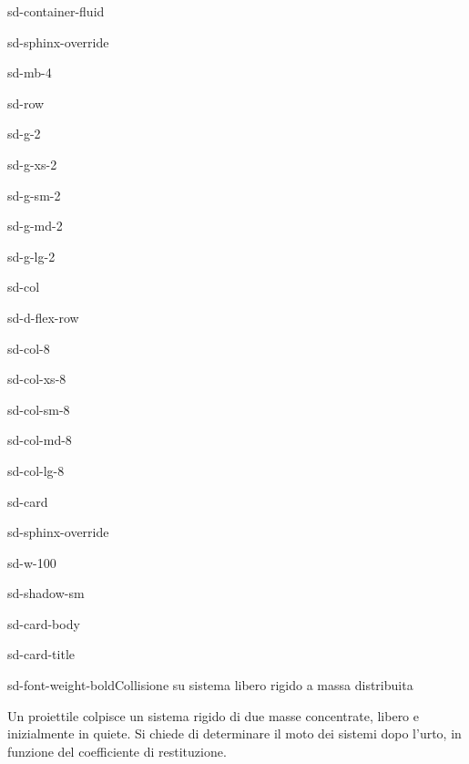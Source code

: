 \documentclass[letterpaper,10pt,italian]{jupyterBook}
\begin{document}
\begin{sphinxuseclass}{sd-container-fluid}
\begin{sphinxuseclass}{sd-sphinx-override}
\begin{sphinxuseclass}{sd-mb-4}
\begin{sphinxuseclass}{sd-row}
\begin{sphinxuseclass}{sd-g-2}
\begin{sphinxuseclass}{sd-g-xs-2}
\begin{sphinxuseclass}{sd-g-sm-2}
\begin{sphinxuseclass}{sd-g-md-2}
\begin{sphinxuseclass}{sd-g-lg-2}
\begin{sphinxuseclass}{sd-col}
\begin{sphinxuseclass}{sd-d-flex-row}
\begin{sphinxuseclass}{sd-col-8}
\begin{sphinxuseclass}{sd-col-xs-8}
\begin{sphinxuseclass}{sd-col-sm-8}
\begin{sphinxuseclass}{sd-col-md-8}
\begin{sphinxuseclass}{sd-col-lg-8}
\begin{sphinxuseclass}{sd-card}
\begin{sphinxuseclass}{sd-sphinx-override}
\begin{sphinxuseclass}{sd-w-100}
\begin{sphinxuseclass}{sd-shadow-sm}
\begin{sphinxuseclass}{sd-card-body}
\begin{sphinxuseclass}{sd-card-title}
\begin{sphinxuseclass}{sd-font-weight-bold}Collisione su sistema libero rigido a massa distribuita
\end{sphinxuseclass}
\end{sphinxuseclass}
\sphinxAtStartPar
Un proiettile colpisce un sistema rigido di due masse concentrate, libero e inizialmente in quiete. Si chiede di determinare il moto dei sistemi dopo l’urto, in funzione del coefficiente di restituzione.


\end{sphinxuseclass}
\end{sphinxuseclass}
\end{sphinxuseclass}
\end{sphinxuseclass}
\end{sphinxuseclass}
\end{sphinxuseclass}
\end{sphinxuseclass}
\end{sphinxuseclass}
\end{sphinxuseclass}
\end{sphinxuseclass}
\end{sphinxuseclass}
\end{sphinxuseclass}
\end{sphinxuseclass}
\end{sphinxuseclass}
\end{sphinxuseclass}
\end{sphinxuseclass}
\end{sphinxuseclass}
\end{sphinxuseclass}
\end{sphinxuseclass}
\end{sphinxuseclass}
\end{sphinxuseclass}
\end{document}
